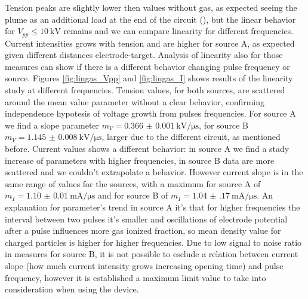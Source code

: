 Tension peaks are slightly lower then values without gas, as expected seeing the plume as an additional load at the end of the circuit (\cite{lieberman1994principles}), but the linear behavior for $V_{pp} \le \SI{10}{\kilo\volt}$ remains and we can compare linearity for different frequencies. Current intensities grows with tension and are higher for source A, as expected given different distances electrode-target. Analysis of linearity also for those measures can show if there is a different behavior changing pulse frequency or source.
Figures \ref{fig:lingas_Vpp} and \ref{fig:lingas_I} shows results of the linearity study at different frequencies.
Tension values, for both sources, are scattered around the mean value parameter without a clear behavior, confirming independence hypotesis of voltage growth from pulses frequencies. For source A we find a slope parameter $m_{V} = \SI{0.366(1)}{\kilo\volt/\micro\second}$, for source B $m_{V} = \SI{1.145(8)}{\kilo\volt/\micro\second}$, larger due to the different circuit, as mentioned before.
Current values shows a different behavior: in source A we find a stady increase of parameters with higher frequencies, in source B data are more scattered and we couldn't extrapolate a behavior. However current slope is in the same range of values for the sources, with a maximum for source A of $m_{I} = \SI{1.10(1)}{\milli\ampere/\micro\second}$ and for source B of $m_{I} = \SI{1.04(17)}{\milli\ampere/\micro\second}$.
An explanation for parameter's trend in source A it's that for higher frequencies the interval between two pulses it's smaller and oscillations of electrode potential after a pulse influences more gas ionized fraction, so mean density value for charged particles is higher for higher frequencies. 
Due to low signal to noise ratio in measures for source B, it is not possible to esclude a relation between current slope (how much current intensity grows increasing opening time) and pulse frequency, however it is established a maximum limit value to take into consideration when using the device.

